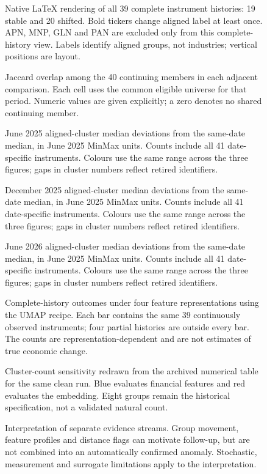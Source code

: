 \clearpage
\begin{figure}[p]
\centering
{}
\caption{Native LaTeX rendering of all 39 complete instrument histories: 19 stable and 20 shifted. Bold tickers change aligned label at least once. APN, MNP, GLN and PAN are excluded only from this complete-history view. Labels identify aligned groups, not industries; vertical positions are layout.}\end{figure}
\clearpage
\begin{figure}[p]
\centering
{}
\caption{Jaccard overlap among the 40 continuing members in each adjacent comparison. Each cell uses the common eligible universe for that period. Numeric values are given explicitly; a zero denotes no shared continuing member.}\end{figure}
\clearpage
\begin{figure}[p]
\centering
{}
\caption{June 2025 aligned-cluster median deviations from the same-date median, in June 2025 MinMax units. Counts include all 41 date-specific instruments. Colours use the same range across the three figures; gaps in cluster numbers reflect retired identifiers.}\end{figure}
\clearpage
\begin{figure}[p]
\centering
{}
\caption{December 2025 aligned-cluster median deviations from the same-date median, in June 2025 MinMax units. Counts include all 41 date-specific instruments. Colours use the same range across the three figures; gaps in cluster numbers reflect retired identifiers.}\end{figure}
\clearpage
\begin{figure}[p]
\centering
{}
\caption{June 2026 aligned-cluster median deviations from the same-date median, in June 2025 MinMax units. Counts include all 41 date-specific instruments. Colours use the same range across the three figures; gaps in cluster numbers reflect retired identifiers.}\end{figure}
\clearpage
\begin{figure}[p]
\centering
{}
\caption{Complete-history outcomes under four feature representations using the UMAP recipe. Each bar contains the same 39 continuously observed instruments; four partial histories are outside every bar. The counts are representation-dependent and are not estimates of true economic change.}\end{figure}
\clearpage
\begin{figure}[p]
\centering
{}
\caption{Cluster-count sensitivity redrawn from the archived numerical table for the same clean run. Blue evaluates financial features and red evaluates the embedding. Eight groups remain the historical specification, not a validated natural count.}\end{figure}
\clearpage
\begin{figure}[p]
\centering
{}
\caption{Interpretation of separate evidence streams. Group movement, feature profiles and distance flags can motivate follow-up, but are not combined into an automatically confirmed anomaly. Stochastic, measurement and surrogate limitations apply to the interpretation.}\end{figure}

